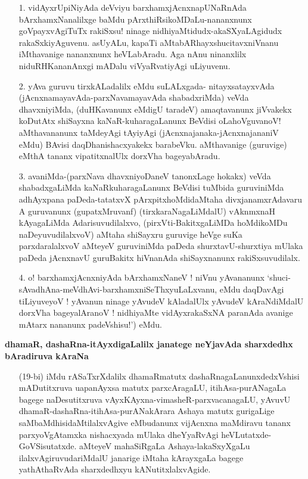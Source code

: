 \begin{itemize}
\item[1.] vidAyxrUpiNiyAda deVviyu barxhamxjAcnxnapUNaRnAda bArxhamxNanalilxge baMdu pArxthiRsikoMDaLu-nananxnunx goVpayxvAgiTuTx rakiSxsu! ninage nidhiyaMtidudx-akaSXyaLAgidudx rakaSxkiyAguvenu. asUyALu, kapaTi aMtabARhayxshucitavxniVnanu iMthavanige nananxnunx heVLabAradu. Aga nAnu ninanxlilx niduRHKananAnxgi mADalu viVyaRvatiyAgi uLiyuvenu.

\item[2.] yAva guruvu tirxkALadalilx eMdu suLALxgada- nitayxsatayxvAda (jAcnxnamayavAda-parxNavamayavAda shabadxriMda) veVda dhavxniyiMda, (duHKavanunx eMdigU taradeV) amaqtavanunx jiVvakekx koDutAtx shiSayxna kaNaR-kuharagaLanunx BeVdisi oLahoVguvanoV! aMthavananunx taMdeyAgi tAyiyAgi (jAcnxnajanaka-jAcnxnajananiV eMdu) BAvisi daqDhanishacxyakekx barabeVku. aMthavanige (guruvige) eMthA tananx vipatitxnalUlx dorxVha bageyabAradu.

\item[3.] avaniMda-(parxNava dhavxniyoDaneV tanonxLage hokakx) veVda shabadxgaLiMda kaNaRkuharagaLanunx BeVdisi tuMbida guruviniMda adhAyxpana paDeda-tatatxvX pArxpitxhoMdidaMtaha divxjanamxrAdavaru A guruvanunx (gupatxMruvanf) (tirxkaraNagaLiMdalU) vAknmxnaH kAyagaLiMda Adarisuvudilalxvo, (pirxVti-BakitxgaLiMDa hoMdikoMDu naDeyuvudilalxvoV) aMtaha shiSayxru guruvige heVge suKa parxdaralalxvoV aMteyeV guruviniMda paDeda shurxtavU-shurxtiya mUlaka paDeda jAcnxnavU guruBakitx hiVnanAda shiSayxnanunx rakiSxsuvudilalx.

\item[4.] o! barxhamxjAcnxniyAda bArxhamxNaneV ! niVnu yAvananunx `shuci-sAvadhAna-meVdhAvi-barxhamxniSeThxyuLaLxvanu, eMdu daqDavAgi tiLiyuveyoV ! yAvanun ninage yAvudeV kAladalUlx yAvudeV kAraNdiMdalU dorxVha bageyalAranoV ! nidhiyaMte vidAyxrakaSxNA paranAda avanige mAtarx nananunx padeVshisu!') eMdu.
\end{itemize}

\textbf{dhamaR, dashaRna-itAyxdigaLalilx janatege neYjavAda sharxdedhx bAradiruva kAraNa}

\begin{itemize}
\item[(19-bi)] iMdu rASaTxrXdalilx dhamaRmatutx dashaRnagaLanunxdedxVshisi mADutitxruva uapanAyxsa matutx parxcAragaLU, itihAsa-purANagaLa bagege naDesutitxruva vAyxKAyxna-vimasheR-parxvacanagaLU, yAvuvU dhamaR-dashaRna-itihAsa-purANakArara Ashaya matutx gurigaLige saMbaMdhisidaMtilalxvAgive eMbudanunx vijAcnxna maMdiravu tananx parxyoVgAtamxka nishacxyada mUlaka dheYyaRvAgi heVLutatxde-GoVSisutatxde. aMteyeV mahaSiRgaLa Ashaya-lakaSxyXgaLu ilalxvAgiruvudariMdalU janarige iMtaha kArayxgaLa bagege yathAthaRvAda sharxdedhxyu kANutitxlalxvAgide.
\end{itemize}

